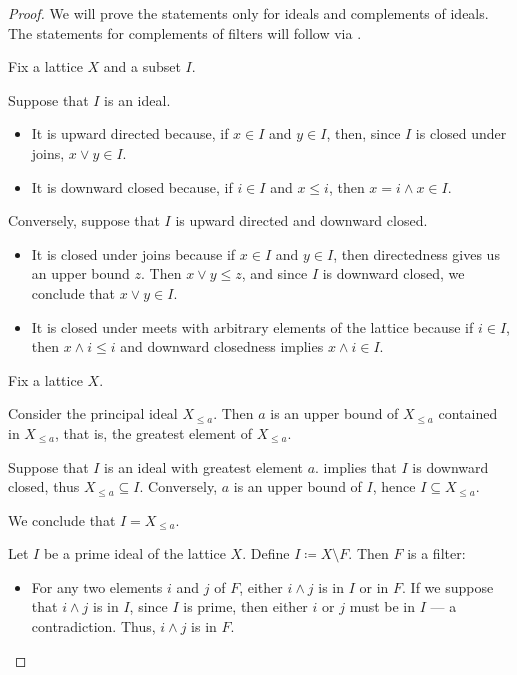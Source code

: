 \begin{proof}
  We will prove the statements only for ideals and complements of ideals. The statements for complements of filters will follow via .

   Fix a lattice \( X \) and a subset \( I \).

  \SufficiencySubProof* Suppose that \( I \) is an ideal.

  \begin{itemize}
    \item It is upward directed because, if \( x \in I \) and \( y \in I \), then, since \( I \) is closed under joins, \( x \vee y \in I \).
    \item It is downward closed because, if \( i \in I \) and \( x \leq i \), then \( x = i \wedge x \in I \).
  \end{itemize}

  \NecessitySubProof* Conversely, suppose that \( I \) is upward directed and downward closed.

  \begin{itemize}
    \item It is closed under joins because if \( x \in I \) and \( y \in I \), then directedness gives us an upper bound \( z \). Then \( x \vee y \leq z \), and since \( I \) is downward closed, we conclude that \( x \vee y \in I \).

    \item It is closed under meets with arbitrary elements of the lattice because if \( i \in I \), then \( x \wedge i \leq i \) and downward closedness implies \( x \wedge i \in I \).
  \end{itemize}

   Fix a lattice \( X \).

  \SufficiencySubProof* Consider the principal ideal \( X_{\leq a} \). Then \( a \) is an upper bound of \( X_{\leq a} \) contained in \( X_{\leq a} \), that is, the greatest element of \( X_{\leq a} \).

  \NecessitySubProof* Suppose that \( I \) is an ideal with greatest element \( a \).  implies that \( I \) is downward closed, thus \( X_{\leq a} \subseteq I \). Conversely, \( a \) is an upper bound of \( I \), hence \( I \subseteq X_{\leq a} \).

  We conclude that \( I = X_{\leq a} \).

   Let \( I \) be a prime ideal of the lattice \( X \). Define \( I \coloneqq X \setminus F \). Then \( F \) is a filter:
  \begin{itemize}
    \item For any two elements \( i \) and \( j \) of \( F \), either \( i \wedge j \) is in \( I \) or in \( F \). If we suppose that \( i \wedge j \) is in \( I \), since \( I \) is prime, then either \( i \) or \( j \) must be in \( I \) --- a contradiction. Thus, \( i \wedge j \) is in \( F \).


\end{itemize}
\end{proof}
